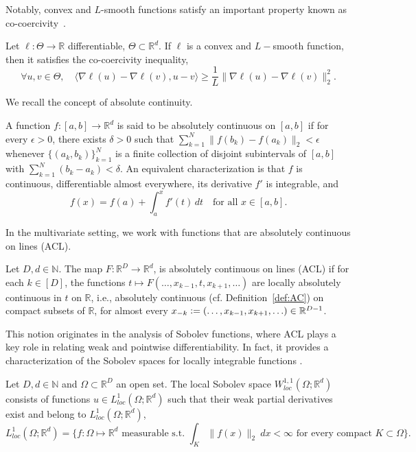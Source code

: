 \documentclass[twoside,11pt]{article}
\newcommand\mb{\mathbb}
\newcommand{\R}{\mathbb{R}}
\begin{document}
Notably, convex and $L$-smooth functions satisfy an important property known as co-coercivity~\citep[e.g.,][Proposition 5.4]{bach-ltfp}. 
\begin{lemma}[Co-coercivity]\label{lem:cocoercivity}
    Let $\ell: \Theta \to \mb{R}$ differentiable, $\Theta \subset \mb{R}^d$. 
    If $\ell$ is a convex and $L-$smooth function, then it satisfies the co-coercivity inequality,
    \begin{equation}\label{co-coercivity}
        \forall u, v \in \Theta,\quad \langle \nabla \ell (u) - \nabla \ell (v), u-v\rangle \geq \frac{1}{L} \|\nabla \ell (u) - \nabla \ell (v)\|_2^2.
    \end{equation}
\end{lemma}
We recall the concept of absolute continuity.
\begin{definition}\label{def:AC}
A function $f: [a, b] \to \mathbb{R}^d$ is said to be absolutely continuous on $[a, b]$ if for every $\epsilon > 0$, there exists $\delta > 0$ such that
$
    \sum_{k=1}^N \|f(b_k) - f(a_k)\|_2 < \epsilon
$
whenever $\{(a_k, b_k)\}_{k=1}^N$ is a finite collection of disjoint subintervals of $[a, b]$ with
$
    \sum_{k=1}^N (b_k - a_k) < \delta.
$
An equivalent characterization is that $f$ is continuous, differentiable almost everywhere, its derivative $f'$ is integrable, and
\[
    f(x) = f(a) + \int_a^x f'(t) \, dt \quad \text{for all } x \in [a, b].
\]
\end{definition}
In the multivariate setting, we work with functions that are absolutely continuous on lines (ACL). 
\begin{definition}\label{def:ACL}
    Let $D,d \in \mathbb{N}$. 
    The map $F: \R^D \to \R^d$, is absolutely continuous on lines (ACL) if for each $k\in[D]$, the functions $t \mapsto F(\ldots, x_{k-1}, t, x_{k+1}, \ldots)$ are locally absolutely continuous in $t$ on $\R$, i.e., absolutely continuous (cf. Definition~\ref{def:AC}) on compact subsets of $\R$, for almost every $x_{-k} \vcentcolon= (\ldots, x_{k-1}, x_{k+1}, \ldots) \in \R^{D-1}$.
\end{definition}
This notion originates in the analysis of Sobolev functions, where ACL plays a key role in relating weak and pointwise differentiability.
In fact, it provides a characterization of the Sobolev spaces for locally integrable functions \citep[cf.][Theorem 11.45]{leoni2017first}.
\begin{definition}\label{def:sobolevfunc}
    Let $D,d \in \mathbb{N}$ and $\Omega \subset \R^D$ an open set.
    The local Sobolev space $W^{1,1}_{loc}(\Omega; \R^d)$ consists of functions $u \in L^1_{loc}(\Omega; \R^d)$ such that their weak partial derivatives exist and belong to $L^1_{loc}(\Omega; \R^d)$, 
    \[
    L^1_{loc}(\Omega; \R^d) = \{ f: \Omega \mapsto \R^d \text{ measurable s.t. } \int_K \|f(x)\|_2\ dx < \infty \text{ for every compact } K \subset \Omega \}.
    \]
\end{definition}
\end{document}
